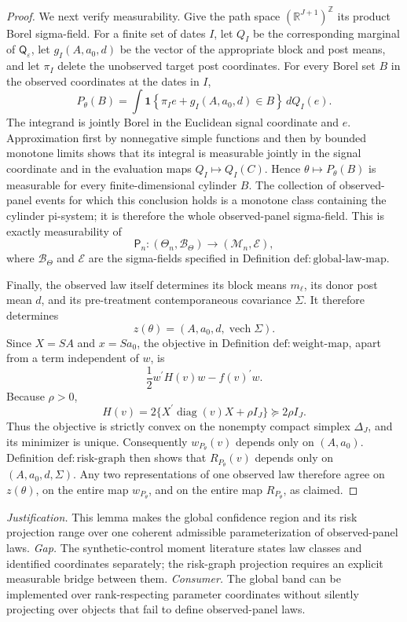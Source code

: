 \documentclass{article}
\begin{document}
\begin{proof}
We next verify measurability.  Give the path space \((\mathbb R^{J+1})^{\mathbb Z}\) its product Borel sigma-field.  For a finite set of dates \(I\), let \(Q_I\) be the corresponding marginal of \(\mathsf Q_\varepsilon\), let \(g_I(A,a_0,d)\) be the vector of the appropriate block and post means, and let \(\pi_I\) delete the unobserved target post coordinates.  For every Borel set \(B\) in the observed coordinates at the dates in \(I\),
\[
P_\theta(B)
=\int
\mathbf 1\!\left\{\pi_I e+g_I(A,a_0,d)\in B\right\}
\,dQ_I(e).
\]
The integrand is jointly Borel in the Euclidean signal coordinate and \(e\).  Approximation first by nonnegative simple functions and then by bounded monotone limits shows that its integral is measurable jointly in the signal coordinate and in the evaluation maps \(Q_I\mapsto Q_I(C)\).  Hence \(\theta\mapsto P_\theta(B)\) is measurable for every finite-dimensional cylinder \(B\).  The collection of observed-panel events for which this conclusion holds is a monotone class containing the cylinder pi-system; it is therefore the whole observed-panel sigma-field.  This is exactly measurability of
\[
\mathsf P_n:(\Theta_n,\mathcal B_\Theta)\longrightarrow
(\mathcal M_n,\mathcal E),
\]
where \(\mathcal B_\Theta\) and \(\mathcal E\) are the sigma-fields specified in Definition \(\mathrm{def:global\mbox{-}law\mbox{-}map}\).

Finally, the observed law itself determines its block means \(m_\ell\), its donor post mean \(d\), and its pre-treatment contemporaneous covariance \(\Sigma\).  It therefore determines
\[
z(\theta)=(A,a_0,d,\operatorname{vech}\Sigma).
\]
Since \(X=SA\) and \(x=Sa_0\), the objective in Definition \(\mathrm{def:weight\mbox{-}map}\), apart from a term independent of \(w\), is
\[
\frac12 w^{\prime}H(v)w-f(v)^{\prime}w.
\]
Because \(\rho>0\),
\[
H(v)=2\{X^{\prime}\operatorname{diag}(v)X+\rho I_J\}
\succeq 2\rho I_J.
\]
Thus the objective is strictly convex on the nonempty compact simplex \(\Delta_J\), and its minimizer is unique.  Consequently \(w_{P_\theta}(v)\) depends only on \((A,a_0)\).  Definition \(\mathrm{def:risk\mbox{-}graph}\) then shows that \(R_{P_\theta}(v)\) depends only on \((A,a_0,d,\Sigma)\).  Any two representations of one observed law therefore agree on \(z(\theta)\), on the entire map \(w_{P_\theta}\), and on the entire map \(R_{P_\theta}\), as claimed.
\end{proof}
\par\smallskip\noindent \textit{Justification.} This lemma makes the global confidence region and its risk projection range over one coherent admissible parameterization of observed-panel laws. \textit{Gap.} The synthetic-control moment literature states law classes and identified coordinates separately; the risk-graph projection requires an explicit measurable bridge between them. \textit{Consumer.} The global band can be implemented over rank-respecting parameter coordinates without silently projecting over objects that fail to define observed-panel laws.
\end{document}
